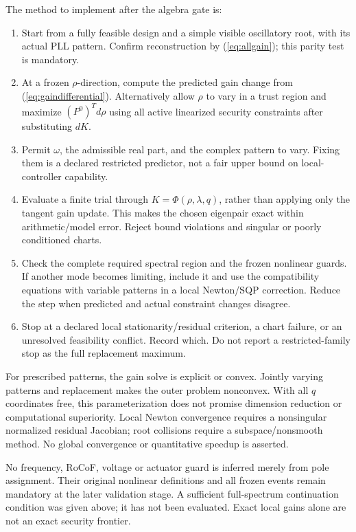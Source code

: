 \documentclass[11pt]{article}
\begin{document}
The method to implement after the algebra gate is:
\begin{enumerate}
 \item Start from a fully feasible design and a simple visible oscillatory
 root, with its actual PLL pattern. Confirm reconstruction by
 (\ref{eq:allgain}); this parity test is mandatory.
 \item At a frozen $\rho$-direction, compute the predicted gain change
 from (\ref{eq:gaindifferential}). Alternatively allow $\rho$ to vary
 in a trust region and maximize $(P^0)^T d\rho$ using all active
 linearized security constraints after substituting $dK$.
 \item Permit $\omega$, the admissible real part, and the complex
 pattern to vary. Fixing them is a declared restricted predictor,
 not a fair upper bound on local-controller capability.
 \item Evaluate a finite trial through $K=\Phi(\rho,\lambda,q)$,
 rather than applying only the tangent gain update.
 This makes the chosen eigenpair exact within arithmetic/model error.
 Reject bound violations and singular or poorly conditioned charts.
 \item Check the complete required spectral region and the frozen
 nonlinear guards. If another mode becomes limiting, include it and
 use the compatibility equations with variable patterns in a local
 Newton/SQP correction. Reduce the step when predicted and actual
 constraint changes disagree.
 \item Stop at a declared local stationarity/residual criterion,
 a chart failure, or an unresolved feasibility conflict. Record which.
 Do not report a restricted-family stop as the full replacement maximum.
\end{enumerate}
For prescribed patterns, the gain solve is explicit or convex. Jointly
varying patterns and replacement makes the outer problem nonconvex.
With all $q$ coordinates free, this parameterization does not promise
dimension reduction or computational superiority. Local Newton
convergence requires a nonsingular normalized residual Jacobian;
root collisions require a subspace/nonsmooth method. No global
convergence or quantitative speedup is asserted.

No frequency, RoCoF, voltage or actuator guard is inferred merely from
pole assignment. Their original nonlinear definitions and all frozen
events remain mandatory at the later validation stage. A sufficient
full-spectrum continuation condition was given above; it has not been
evaluated. Exact local gains alone are not an exact security frontier.
\end{document}
